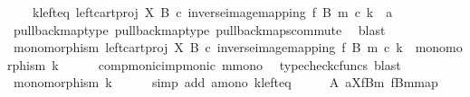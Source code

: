 \begin{isabellebody}
\ \ \ \ k{\isacharunderscore}{\kern0pt}left{\isacharunderscore}{\kern0pt}eq{\isacharcolon}{\kern0pt}\ {\isachardoublequoteopen}{\isacharparenleft}{\kern0pt}left{\isacharunderscore}{\kern0pt}cart{\isacharunderscore}{\kern0pt}proj\ X\ B\ {\isasymcirc}\isactrlsub c\ inverse{\isacharunderscore}{\kern0pt}image{\isacharunderscore}{\kern0pt}mapping\ f\ B\ m{\isacharparenright}{\kern0pt}\ {\isasymcirc}\isactrlsub c\ k\ {\isacharequal}{\kern0pt}\ a{\isachardoublequoteclose}\isanewline
\ \ \ \ \isamarkupfalse%
\ pullback{\isacharunderscore}{\kern0pt}map{}{\isacharunderscore}{\kern0pt}type\ pullback{\isacharunderscore}{\kern0pt}map{}{\isacharunderscore}{\kern0pt}type\ pullback{\isacharunderscore}{\kern0pt}maps{\isacharunderscore}{\kern0pt}commute\ \isamarkupfalse%
\ blast\isanewline
\isanewline
\ \ \isamarkupfalse%
\ {\isachardoublequoteopen}monomorphism\ {\isacharparenleft}{\kern0pt}{\isacharparenleft}{\kern0pt}left{\isacharunderscore}{\kern0pt}cart{\isacharunderscore}{\kern0pt}proj\ X\ B\ {\isasymcirc}\isactrlsub c\ inverse{\isacharunderscore}{\kern0pt}image{\isacharunderscore}{\kern0pt}mapping\ f\ B\ m{\isacharparenright}{\kern0pt}\ {\isasymcirc}\isactrlsub c\ k{\isacharparenright}{\kern0pt}\ {\isasymLongrightarrow}\ monomorphism\ k{\isachardoublequoteclose}\isanewline
\ \ \ \ \isamarkupfalse%
\ comp{\isacharunderscore}{\kern0pt}monic{\isacharunderscore}{\kern0pt}imp{\isacharunderscore}{\kern0pt}monic{\isacharprime}{\kern0pt}\ m{\isacharunderscore}{\kern0pt}mono\ \isamarkupfalse%
\ {\isacharparenleft}{\kern0pt}typecheck{\isacharunderscore}{\kern0pt}cfuncs{\isacharcomma}{\kern0pt}\ blast{\isacharparenright}{\kern0pt}\isanewline
\ \ \isamarkupfalse%
\ \isamarkupfalse%
\ {\isachardoublequoteopen}monomorphism\ k{\isachardoublequoteclose}\isanewline
\ \ \ \ \isamarkupfalse%
\ {\isacharparenleft}{\kern0pt}simp\ add{\isacharcolon}{\kern0pt}\ a{\isacharunderscore}{\kern0pt}mono\ k{\isacharunderscore}{\kern0pt}left{\isacharunderscore}{\kern0pt}eq{\isacharparenright}{\kern0pt}\isanewline
\ \ \isamarkupfalse%
\ \isamarkupfalse%
\ {\isachardoublequoteopen}{\isacharparenleft}{\kern0pt}A{\isacharcomma}{\kern0pt}\ a{\isacharparenright}{\kern0pt}{\isasymsubseteq}\isactrlbsub X\isactrlesub {\isacharparenleft}{\kern0pt}f\isactrlsup {\isacharminus}{\kern0pt}B{\isasymrparr}\isactrlbsub m\isactrlesub {\isacharcomma}{\kern0pt}\ {\isacharbrackleft}{\kern0pt}f\isactrlsup {\isacharminus}{\kern0pt}B{\isasymrparr}\isactrlbsub m\isactrlesub {\isacharbrackright}{\kern0pt}map{\isacharparenright}{\kern0pt}{\isachardoublequoteclose}\isanewline

\end{isabellebody}
